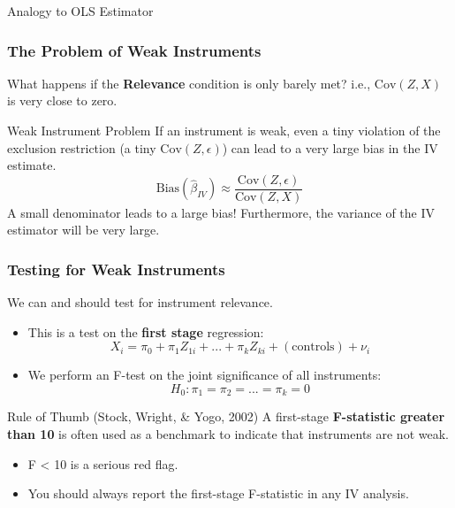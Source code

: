 \documentclass[
  ignorenonframetext,
  aspectratio=169]{beamer}
\newcommand{\Cov}{\text{Cov}}
\begin{document}
\begin{frame}{Analogy to OLS Estimator}
\begin{frame}
\frametitle{The Problem of Weak Instruments}
What happens if the \textbf{Relevance} condition is only barely met?
i.e., $\Cov(Z,X)$ is very close to zero.

\begin{alertblock}{Weak Instrument Problem}
If an instrument is weak, even a tiny violation of the exclusion restriction (a tiny $\Cov(Z, \epsilon)$) can lead to a very large bias in the IV estimate.
\[ \text{Bias}(\hat{\beta}_{IV}) \approx \frac{\Cov(Z, \epsilon)}{\Cov(Z, X)} \]
A small denominator leads to a large bias! Furthermore, the variance of the IV estimator will be very large.
\end{alertblock}
\end{frame}

\begin{frame}
\frametitle{Testing for Weak Instruments}
We can and should test for instrument relevance.
\begin{itemize}
    \item This is a test on the \textbf{first stage} regression:
    \[ X_i = \pi_0 + \pi_1 Z_{1i} + ... + \pi_k Z_{ki} + (\text{controls}) + \nu_i \]
    \item We perform an F-test on the joint significance of all instruments:
    \[ H_0: \pi_1 = \pi_2 = ... = \pi_k = 0 \]
\end{itemize}
\pause
\begin{block}{Rule of Thumb (Stock, Wright, \& Yogo, 2002)}
A first-stage \textbf{F-statistic greater than 10} is often used as a benchmark to indicate that instruments are not weak.
\begin{itemize}
    \item F < 10 is a serious red flag.
    \item You should always report the first-stage F-statistic in any IV analysis.
\end{itemize}
\end{block}
\end{frame}


\end{frame}
\end{document}
